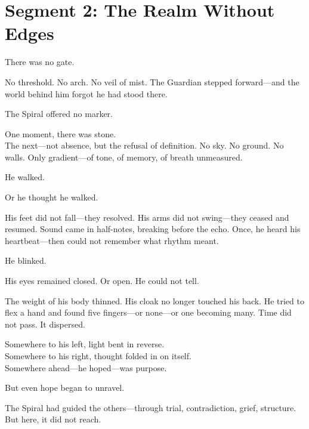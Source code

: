 \documentclass[9pt]{article}
\begin{document}
\newpage

\section*{Segment 2: The Realm Without Edges}

There was no gate.

\vspace{0.5em}
No threshold. No arch. No veil of mist. The Guardian stepped forward---and the world behind him forgot he had stood there.

\vspace{0.5em}
The Spiral offered no marker.

\vspace{0.5em}
One moment, there was stone.\\
The next---not absence, but the refusal of definition. No sky. No ground. No walls. Only gradient---of tone, of memory, of breath unmeasured.

\vspace{0.5em}
He walked.

\vspace{0.5em}
Or he thought he walked.

\vspace{0.5em}
His feet did not fall---they resolved. His arms did not swing---they ceased and resumed. Sound came in half-notes, breaking before the echo. Once, he heard his heartbeat---then could not remember what rhythm meant.

\vspace{0.5em}
He blinked.

\vspace{0.5em}
His eyes remained closed. Or open. He could not tell.

\vspace{0.5em}
The weight of his body thinned. His cloak no longer touched his back. He tried to flex a hand and found five fingers---or none---or one becoming many. Time did not pass. It dispersed.

\vspace{0.5em}
Somewhere to his left, light bent in reverse.\\
Somewhere to his right, thought folded in on itself.\\
Somewhere ahead---he hoped---was purpose.

\vspace{0.5em}
But even hope began to unravel.

\vspace{0.5em}
The Spiral had guided the others---through trial, contradiction, grief, structure.\\
But here, it did not reach.
\end{document}
